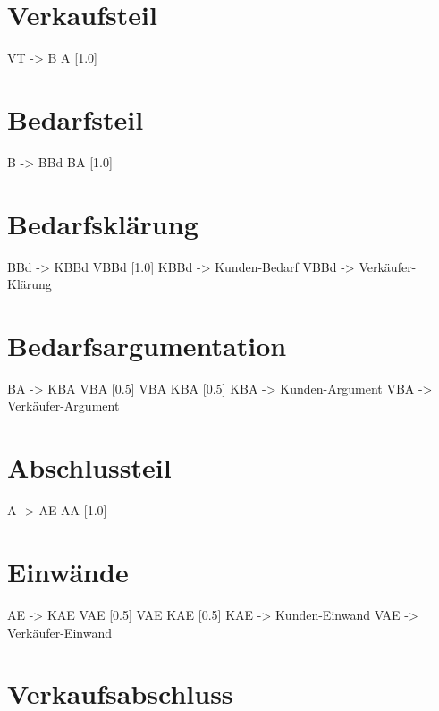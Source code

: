 \documentclass[
]{article}
\begin{document}
\section{Verkaufsteil}\label{verkaufsteil}

VT -\textgreater{} B A {[}1.0{]}

\section{Bedarfsteil}\label{bedarfsteil}

B -\textgreater{} BBd BA {[}1.0{]}

\section{Bedarfsklärung}\label{bedarfskluxe4rung}

BBd -\textgreater{} KBBd VBBd {[}1.0{]} KBBd -\textgreater{}
\textquotesingle Kunden-Bedarf\textquotesingle{} VBBd -\textgreater{}
\textquotesingle Verkäufer-Klärung\textquotesingle{}

\section{Bedarfsargumentation}\label{bedarfsargumentation}

BA -\textgreater{} KBA VBA {[}0.5{]} \textbar{} VBA KBA {[}0.5{]} KBA
-\textgreater{} \textquotesingle Kunden-Argument\textquotesingle{} VBA
-\textgreater{} \textquotesingle Verkäufer-Argument\textquotesingle{}

\section{Abschlussteil}\label{abschlussteil}

A -\textgreater{} AE AA {[}1.0{]}

\section{Einwände}\label{einwuxe4nde}

AE -\textgreater{} KAE VAE {[}0.5{]} \textbar{} VAE KAE {[}0.5{]} KAE
-\textgreater{} \textquotesingle Kunden-Einwand\textquotesingle{} VAE
-\textgreater{} \textquotesingle Verkäufer-Einwand\textquotesingle{}

\section{Verkaufsabschluss}\label{verkaufsabschluss}
\end{document}
